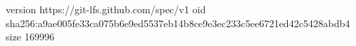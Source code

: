 version https://git-lfs.github.com/spec/v1
oid sha256:a9ae005fe33ca075b6e9ed5537eb14b8ce9e3ec233c5ee6721ed42c5428abdb4
size 169996
